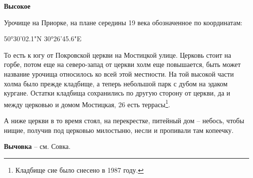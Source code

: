 \medskip

\textbf{Высокое}

Урочище на Приорке, на плане середины 19 века обозначенное по координатам:

50°30'02.1"N 30°26'45.6"E

То есть к югу от Покровской церкви на Мостицкой улице. Церковь стоит на горбе, потом еще на северо-запад от церкви холм еще повышается, быть может название урочища относилось ко всей этой местности.  На той высокой части холма было прежде кладбище, а теперь небольшой парк с дубом на эдаком кургане. Остатки кладбища сохранились по другую сторону от церкви, да и между церковью и домом Мостицкая, 26 есть террасы\footnote{Кладбище сие было снесено в 1987 году.}.

А ниже церкви в то время стоял, на перекрестке, питейный дом – небось, чтобы нищие, получив под церковью милостыню, несли и пропивали там копеечку.\\

\medskip

\textbf{Вычовка} – см. Совка.\\